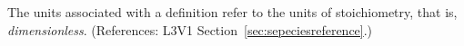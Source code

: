 The units associated with a \SpeciesReference definition refer to the
units of stoichiometry, that is, \emph{dimensionless}.  (References: 
L3V1 Section~\ref{sec:sepeciesreference}.)
